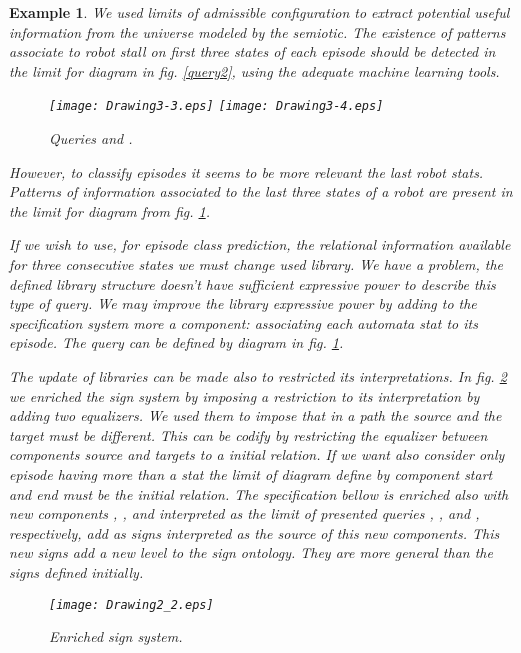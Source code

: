 \documentclass[oribibl]{llncs}
\newtheorem{exam}{Example}
\begin{document}
\begin{exam}
We used limits of admissible configuration to extract potential useful information from the universe modeled by the semiotic. The existence of patterns associate to robot stall on first three states of each episode should be detected in the limit for diagram  in fig. \ref{query2}, using the adequate machine learning tools.
\begin{figure}[h]
    \begin{center}
    \texttt{[image: Drawing3-3.eps]}
    \texttt{[image: Drawing3-4.eps]}
    \end{center}
    \caption{Queries  and .}\label{query2}\label{query3}
\end{figure}
However, to classify episodes it seems to be more relevant the last robot stats. Patterns of information associated to the last three states of a robot are present in the limit for diagram  from fig. \ref{query3}.

If we wish to use, for episode class prediction, the relational information available for three consecutive states we must change used library. We have a problem, the defined library structure doesn't have sufficient expressive power to describe this type of query. We may improve the library expressive power by adding to the specification system more a component: associating each automata stat to its episode. The query can be defined by diagram  in fig. \ref{query3}.

The update of libraries can be made also to restricted its interpretations. In fig. \ref{enrichsemiotic} we enriched the sign system by imposing a restriction to its interpretation by adding two equalizers. We used them to impose that in a path the source and the target must be different. This can be codify by restricting the equalizer between components \emph{source} and \emph{targets} to a initial relation. If we want also consider only episode having more than a stat the limit of diagram define by component \emph{start} and \emph{end} must be the initial relation. The specification bellow is enriched also with new components , ,  and  interpreted as the limit of presented queries , ,  and , respectively, add as signs interpreted as the source of this new components. This new signs add a new level to the sign ontology. They are more general than the signs defined initially.

\begin{figure}[h]
    \begin{center}
    \texttt{[image: Drawing2\_2.eps]}
    \end{center}
    \caption{Enriched sign system.}\label{enrichsemiotic}
\end{figure}


\end{exam}
\end{document}
